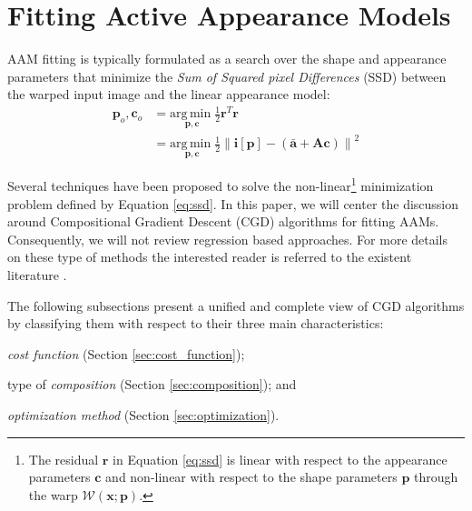 \section{Fitting Active Appearance Models}
\label{sec:fitting}

AAM fitting is typically formulated as a search over the shape and appearance parameters that minimize the \emph{Sum of Squared pixel Differences} (SSD) between the warped input image and the linear appearance model:
\begin{equation}
    \begin{aligned}
        \mathbf{p}_o, \mathbf{c}_o & = \underset{\mathbf{p}, \mathbf{c}}{\mathrm{arg\,min\;}} \frac{1}{2} \mathbf{r}^T\mathbf{r}
        \\
        & = \underset{\mathbf{p}, \mathbf{c}}{\mathrm{arg\,min\;}} 
        \frac{1}{2} \left\| \mathbf{i}[\mathbf{p}] - \left( \bar{\mathbf{a}} + \mathbf{A} \mathbf{c} \right) \right\|^2 
    \label{eq:ssd}
    \end{aligned}
\end{equation}

Several techniques have been proposed to solve the non-linear\footnote{The residual $\mathbf{r}$ in Equation \ref{eq:ssd} is linear with respect to the appearance parameters $\mathbf{c}$ and non-linear with respect to the shape parameters $\mathbf{p}$ through the warp $\mathcal{W}(\mathbf{x}; \mathbf{p})$.} minimization problem defined by Equation \ref{eq:ssd}. In this paper, we will center the discussion around Compositional Gradient Descent (CGD) algorithms \cite{Matthews2004, Gross2005, Papandreou2008, Amberg2009, Martins2010, Tzimiropoulos2013, Kossaifi2014} for fitting AAMs. Consequently, we will not review regression based approaches. For more details on these type of methods the interested reader is referred to the existent literature \cite{Cootes2001, Hou2001, Batur2005, Donner2006, Liu2009, Saragih2009, Tresadern2010, Sauer2011}.

The following subsections present a unified and complete view of CGD algorithms by classifying them with respect to their three main characteristics: 
\begin{inparaenum}
\item \emph{cost function} (Section \ref{sec:cost_function}); 
\item type of \emph{composition} (Section \ref{sec:composition}); and 
\item \emph{optimization method} (Section \ref{sec:optimization}).
\end{inparaenum}

